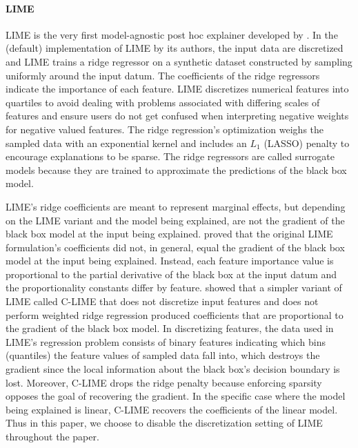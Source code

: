 \documentclass[mnsc,blindrev]{informs3}
\begin{document}
    
\paragraph{LIME}  %
LIME is the very first model-agnostic post hoc explainer developed by \citet{ribeiro16lime}. In the (default) implementation of LIME by its authors, the input data are discretized and LIME trains a ridge regressor on a synthetic dataset constructed by sampling uniformly around the input datum. The coefficients of the ridge regressors indicate the importance of each feature. LIME discretizes numerical features into quartiles to avoid dealing with problems associated with differing scales of features and ensure users do not get confused when interpreting negative weights for negative valued features. The ridge regression's optimization weighs the sampled data with an exponential kernel and includes an $L_1$ (LASSO) penalty to encourage explanations to be sparse. The ridge regressors are called surrogate models because they are trained to approximate the predictions of the black box model.
    
    LIME's ridge coefficients are meant to represent marginal effects, but depending on the LIME variant and the model being explained, are not the gradient of the black box model at the input being explained. \citet{garreau20theoretical,garreau2020looking} proved that the original LIME formulation's coefficients did not, in general, equal the gradient of the black box model at the input being explained. Instead, each feature importance value is proportional to the partial derivative of the black box at the input datum and the proportionality constants differ by feature. \citet{agarwal21clime} showed that a simpler variant of LIME called C-LIME that does not discretize input features and does not perform weighted ridge regression produced coefficients that are proportional to the gradient of the black box model. %
    In discretizing features, the data used in LIME's regression problem consists of binary features indicating which bins (quantiles) the feature values of sampled data fall into, which destroys the gradient since the local information about the black box's decision boundary is lost. Moreover, C-LIME drops the ridge penalty because enforcing sparsity opposes the goal of recovering the gradient. In the specific case where the model being explained is linear, C-LIME recovers the coefficients of the linear model. Thus in this paper, we choose to disable the discretization setting of LIME throughout the paper.
\end{document}
